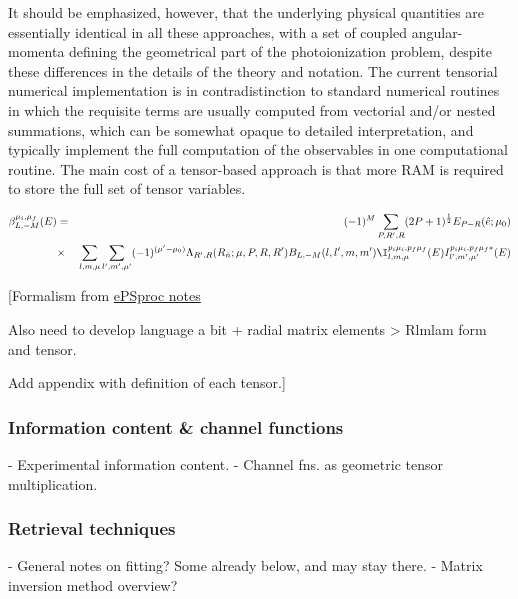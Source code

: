 It should be emphasized, however, that the underlying physical quantities are essentially identical in all these approaches, with a set of coupled angular-momenta defining the geometrical part of the photoionization problem, despite these differences in the details of the theory and notation. The current tensorial numerical implementation is in contradistinction to standard numerical routines in which the requisite terms are usually computed from vectorial and/or nested summations, which can be somewhat opaque to detailed interpretation, and typically implement the full computation of the observables in one computational routine. The main cost of a tensor-based approach is that more RAM is required to store the full set of tensor variables.

\begin{eqnarray}
\beta_{L,-M}^{\mu_{i},\mu_{f}}(E) & = & (-1)^{M}\sum_{P,R',R}(2P+1)^{\frac{1}{2}}{E_{P-R}(\hat{e};\mu_{0})}\\
 & \times &\sum_{l,m,\mu}\sum_{l',m',\mu'}(-1)^{(\mu'-\mu_{0})}{\Lambda_{R',R}(R_{\hat{n}};\mu,P,R,R')B_{L,-M}(l,l',m,m')}\I_{l,m,\mu}^{p_{i}\mu_{i},p_{f}\mu_{f}}(E)I_{l',m',\mu'}^{p_{i}\mu_{i},p_{f}\mu_{f}*}(E)
\end{eqnarray}

[Formalism from 
\href{https://epsproc.readthedocs.io/en/dev/methods/ePSproc_geom_methods_summary_190821-v1-tidy.html}{ePSproc notes}


Also need to develop language a bit + radial matrix elements > Rlmlam form and tensor.

Add appendix with definition of each tensor.]


\subsubsection{Information content \& channel functions}

- Experimental information content.
- Channel fns. as geometric tensor multiplication.


\subsubsection{Retrieval techniques}

- General notes on fitting? Some already below, and may stay there.
- Matrix inversion method overview?
